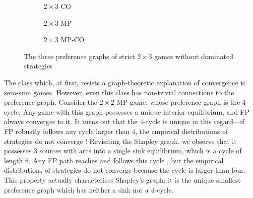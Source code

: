 \documentclass[preprint,authoryear]{elsarticle}
\begin{document}
\begin{figure}
    \centering
    \begin{subfigure}{0.22\textwidth}
    \centering
    
    \caption{$2\times 3$ CO}
    \label{fig:2x3 CO}
    \end{subfigure}
    \begin{subfigure}{0.22\textwidth}
    \centering
    
    \caption{$2\times 3$ MP}
    \label{fig:2x3 MP}
    \end{subfigure}
    \begin{subfigure}{0.22\textwidth}
    \centering
    
    \caption{$2\times 3$ MP-CO}
    \label{fig:2x3 MPCO}
    \end{subfigure}
    \caption{The three preference graphs of strict $2\times 3$ games without dominated strategies \citep{biggar_graph_2023}}
    \label{fig: 2x3}
\end{figure}


The class which, at first, resists a graph-theoretic explanation of convergence is zero-sum games. However, even this class has non-trivial connections to the preference graph. Consider the $2\times 2$ MP game, whose preference graph is the 4-cycle. Any game with this graph possesses a unique interior equilibrium, and FP always converges to it. It turns out that the 4-cycle is unique in this regard---if FP robustly follows any cycle larger than 4, the empirical distributions of strategies do not converge \citep{krishna_convergence_1998}! %
Revisiting the Shapley graph, we observe that it possesses 3 sources with arcs into a single sink equilibrium, which is a cycle of length 6. Any FP path reaches and follows this cycle \citep{monderer_fictitious_1997,berger_two_2007}, but the empirical distributions of strategies do not converge because the cycle is larger than four. This property actually characterises Shapley's graph: it is the unique smallest preference graph which has neither a sink nor a 4-cycle.
\end{document}
